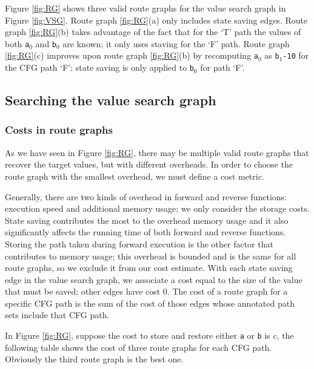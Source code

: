 \documentclass[12pt]{gatech-thesis}
\begin{document}
Figure \ref{fig:RG} shows three valid route graphs for the value search graph in Figure \ref{fig:VSG}. 
Route graph \ref{fig:RG}(a) only includes state saving edges. 
Route graph \ref{fig:RG}(b) takes advantage of the fact that for the `T' path the values of both \texttt{a$_0$} and \texttt{b$_0$} are known; it only uses staving for the `F' path. 
Route graph \ref{fig:RG}(c) improves upon route graph \ref{fig:RG}(b) by recomputing \texttt{a$_0$} as \texttt{b$_1$-10} for the CFG path `F'; state saving is only applied to \texttt{b$_0$} for path `F'.



\subsection{Searching the value search graph}

\subsubsection{Costs in route graphs}
As we have seen in Figure \ref{fig:RG}, there may be multiple valid route graphs that recover the target values, but with different overheads. 
In order to choose the route graph with the smallest overhead, we must define a cost metric.

Generally, there are two kinds of overhead in forward and reverse functions: execution speed and additional memory usage; we only consider the storage costs.
State saving contributes the most to the overhead memory usage and it also significantly affects the running time of both forward and reverse functions. 
Storing the path taken during forward execution is the other factor that contributes to memory usage; this overhead is bounded and is the same for all route graphs, so we exclude it from our cost estimate. 
With each state saving edge in the value search graph, we associate a cost equal to the size of the value that must be saved; other edges have cost 0.
The cost of a route graph for a specific CFG path is the sum of the cost of those edges whose annotated path sets include that CFG path.

In Figure \ref{fig:RG}, suppose the cost to store and restore either \texttt{a} or \texttt{b} is $c$, the following table shows the cost of three route graphs for each CFG path.
Obviously the third route graph is the best one.
\end{document}
